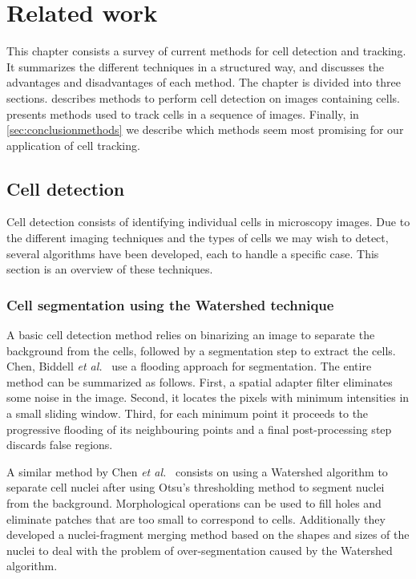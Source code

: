 \chapter{Related work \statusfirstdraft}
\label{chap:relatedwork}
This chapter consists a survey of current methods for cell detection and tracking. It summarizes the different techniques in a structured way, and discusses the advantages and disadvantages of each method. The chapter is divided into three sections.  describes methods to perform cell detection on images containing cells.  presents methods used to track cells in a sequence of images. Finally, in \cref{sec:conclusionmethods} we describe which methods seem most promising for our application of cell tracking. 
	

\section{Cell detection \statusfirstdraft}
\label{sec:detection}
\label{sec:relatedworkdetection}

Cell detection consists of identifying individual cells in microscopy images. Due to the different imaging techniques and the types of cells we may wish to detect, several algorithms have been developed, each to handle a specific case. This section is an overview of these techniques.

\subsection{Cell segmentation using the Watershed technique \statusfirstdraft}

A basic cell detection method relies on binarizing an image to separate the background from the cells, followed by a segmentation step to extract the cells. Chen, Biddell \emph{et al.}~\cite{chen99} use a flooding approach for segmentation. The entire method can be summarized as follows. First, a spatial adapter filter eliminates some noise in the image. Second, it locates the pixels with minimum intensities in a small sliding window. Third, for each minimum point it proceeds to the progressive flooding of its neighbouring points and a final post-processing step discards false regions.

A similar method by Chen \emph{et al.}~\cite{chen06} consists on using a Watershed algorithm \cite{vincent93} to separate cell nuclei after using Otsu's thresholding method to segment nuclei from the background. Morphological operations \cite{serra83} can be used to fill holes and eliminate patches that are too small to correspond to cells. Additionally they developed a nuclei-fragment merging method based on the shapes and sizes of the nuclei to deal with the problem of over-segmentation caused by the Watershed algorithm.

